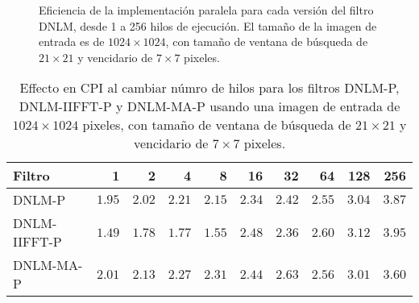   \begin{figure}
  \centering
  \caption[Eficiencia de las implementaciones paralelas del filtro DNLM.]{Eficiencia de la implementaci\'on paralela para cada versi\'on del filtro DNLM, desde 1 a 256 hilos de ejecuci\'on. El tama\~no de la imagen de entrada es de $1024\times1024$, con tama\~no de ventana de b\'usqueda de $21 \times 21$ y vencidario de $7 \times 7$ pixeles. \label{fig:efficiency}}
  \end{figure}
  
  
  
\begin{table}
\protect\caption[Comportamiento del CPI al aumentar numero de hilos]{Effecto en CPI al cambiar n\'umro de hilos para los filtros DNLM-P, DNLM-IIFFT-P y DNLM-MA-P usando una imagen de entrada de  $1024 \times 1024$ pixeles, con tama\~no de ventana de b\'usqueda de $21 \times 21$ y vencidario de $7 \times 7$ pixeles. \label{tabla:scala1}}
\centering
\begin{tabular}{lrrrrrrrrr}
Filtro & 1& 2& 4& 8& 16&32& 64 &128& 256\tabularnewline
\hline
DNLM-P& $1.95$ & $2.02$ & $2.21$ &  $2.15$ &  $2.34$ & $2.42$  & $2.55$  & $3.04 $ & $3.87$ \tabularnewline
DNLM-IIFFT-P &$1.49$ & $1.78$ & $1.77$ &  $1.55$ &  $2.48$ & $2.36$  & $2.60$  & $3.12$  & $3.95$ \tabularnewline
DNLM-MA-P & $2.01$ & $2.13$ & $2.27$ &  $2.31$ &  $ 2.44$ & $2.63$  & $2.56$  & $3.01$  & $3.60$ \tabularnewline
\end{tabular}
\end{table}